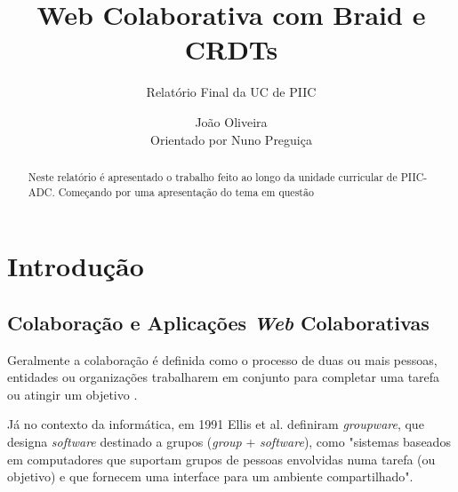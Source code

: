 \documentclass[runningheads]{llncs}
\begin{document}
%
    \title{Web Colaborativa com Braid e CRDTs} 
    \subtitle{Relatório Final da UC de PIIC}
    \author{João Oliveira\\Orientado por Nuno Preguiça}
    \maketitle              %
    \begin{abstract}
        Neste relatório é apresentado o trabalho feito ao longo da unidade
        curricular de PIIC-ADC. Começando por uma apresentação do tema em
        questão

    \end{abstract}
    \section{Introdução}

        \subsection{Colaboração e Aplicações {\itshape Web} Colaborativas}

        Geralmente a colaboração é definida como o processo de duas ou mais
        pessoas, entidades ou organizações trabalharem em conjunto para
        completar uma tarefa ou atingir um objetivo \cite{collab-def}. 
        
        Já no contexto da informática, em 1991 Ellis et al. definiram {\itshape
        groupware}, que designa {\itshape software} destinado a grupos
        ({\itshape group} + {\itshape software}), como "sistemas baseados em
        computadores que suportam grupos de pessoas envolvidas numa tarefa (ou
        objetivo) e que fornecem uma interface para um ambiente
        compartilhado"\cite{groupware-def}. 
\end{document}

